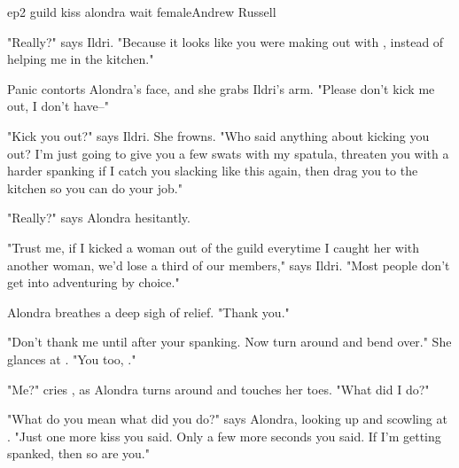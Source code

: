 \documentclass{book}
\begin{document}
\begin{childnode}{ep2 guild kiss alondra wait female}{Andrew Russell}

    "Really?" says Ildri. "Because it looks like you were making out with \name{}, instead of helping me in the kitchen."

    Panic contorts Alondra's face, and she grabs Ildri's arm. "Please don't kick me out, I don't have--"

    "Kick you out?" says Ildri. She frowns. "Who said anything about kicking you out? I'm just going to give you a few swats with my spatula, threaten you with a harder spanking if I catch you slacking like this again, then drag you to the kitchen so you can 
    do your job."

    "Really?" says Alondra hesitantly.

    "Trust me, if I kicked a woman out of the guild everytime I caught her with another woman, we'd lose a third of our members," says Ildri. "Most people don't get into adventuring by choice."

    Alondra breathes a deep sigh of relief. "Thank you."

    "Don't thank me until after your spanking. Now turn around and bend over." She glances at \name{}. "You too, \nickname{}."

    "Me?" cries \name{}, as Alondra turns around and touches her toes. "What did I do?"

    "What do you mean what did you do?" says Alondra, looking up and scowling at \name{}. "Just one more kiss you said. Only a few more seconds you said. If I'm getting spanked, then so are you."



\end{childnode}
\end{document}
